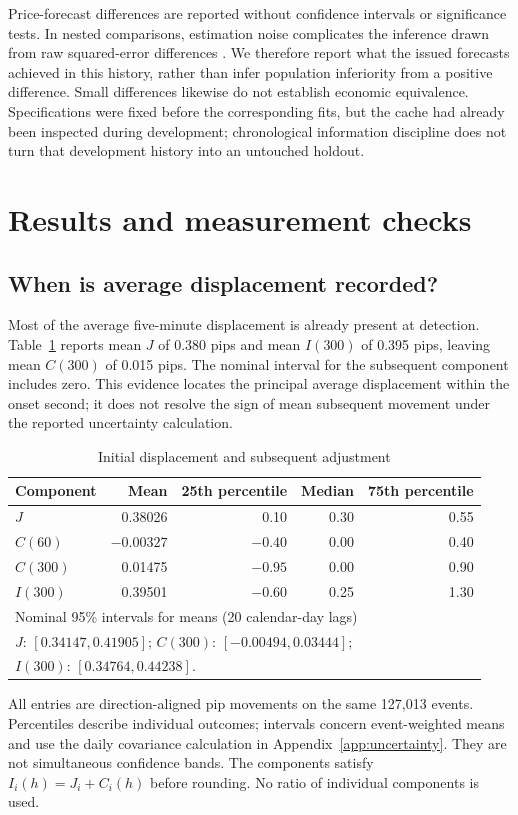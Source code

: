 \documentclass[12pt,letterpaper]{article}
\begin{document}
Price-forecast differences are reported without confidence intervals or significance tests. In nested comparisons, estimation noise complicates the inference drawn from raw squared-error differences \citep{clark2007approximately}. We therefore report what the issued forecasts achieved in this history, rather than infer population inferiority from a positive difference. Small differences likewise do not establish economic equivalence. Specifications were fixed before the corresponding fits, but the cache had already been inspected during development; chronological information discipline does not turn that development history into an untouched holdout.

\section{Results and measurement checks}\label{sec:results}
\subsection{When is average displacement recorded?}
Most of the average five-minute displacement is already present at detection. Table~\ref{tab:adjustment} reports mean $J$ of 0.380 pips and mean $I(300)$ of 0.395 pips, leaving mean $C(300)$ of 0.015 pips. The nominal interval for the subsequent component includes zero. This evidence locates the principal average displacement within the onset second; it does not resolve the sign of mean subsequent movement under the reported uncertainty calculation.

\begin{table}[htbp]\centering
\caption{Initial displacement and subsequent adjustment}\label{tab:adjustment}
\begin{tabular}{lrrrr}\toprule
Component & Mean & 25th percentile & Median & 75th percentile\\\midrule
$J$ &0.38026&0.10&0.30&0.55\\
$C(60)$ &$-0.00327$&$-0.40$&0.00&0.40\\
$C(300)$ &0.01475&$-0.95$&0.00&0.90\\
$I(300)$ &0.39501&$-0.60$&0.25&1.30\\\midrule
\multicolumn{5}{l}{Nominal 95\% intervals for means (20 calendar-day lags)}\\
\multicolumn{5}{l}{$J$: $[0.34147,0.41905]$; $C(300)$: $[-0.00494,0.03444]$;}\\
\multicolumn{5}{l}{$I(300)$: $[0.34764,0.44238]$.}\\\bottomrule
\end{tabular}
\par\smallskip\begin{minipage}{0.94\linewidth}\footnotesize
All entries are direction-aligned pip movements on the same 127,013 events. Percentiles describe individual outcomes; intervals concern event-weighted means and use the daily covariance calculation in Appendix~\ref{app:uncertainty}. They are not simultaneous confidence bands. The components satisfy $I_i(h)=J_i+C_i(h)$ before rounding. No ratio of individual components is used.
\end{minipage}\end{table}
\end{document}
